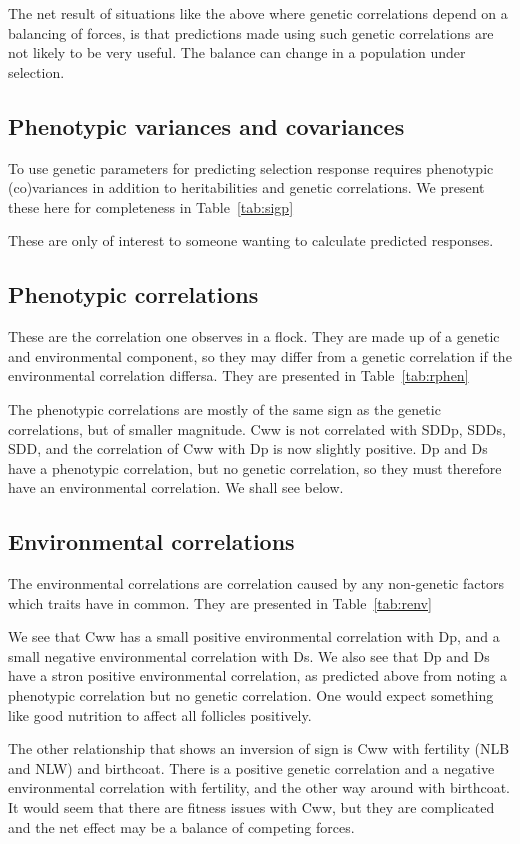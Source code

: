\documentclass[titlepage]{article}  %
\begin{document}
The net result of situations like the above where genetic correlations depend on a balancing of forces, is that predictions made using such genetic correlations are not likely to be very useful. The balance can change in a population under selection.

\subsection{Phenotypic variances and covariances}
To use genetic parameters for predicting selection response requires phenotypic (co)variances in addition to heritabilities and genetic correlations. We present these here for completeness in Table~\ref{tab:sigp}

These are only of interest to someone wanting to calculate predicted responses.

\subsection{Phenotypic correlations}
These are the correlation one observes in a flock. They are made up of a genetic and environmental component, so they may differ from a genetic correlation if the environmental correlation differsa. They are presented in Table~\ref{tab:rphen}

The phenotypic correlations are mostly of the same sign as the genetic correlations, but of smaller magnitude. Cww is not correlated with SDDp, SDDs, SDD, and the  correlation of Cww with Dp is now slightly positive. Dp and Ds have a phenotypic correlation, but no genetic correlation, so they must therefore have an environmental correlation. We shall see below.
 
\subsection{Environmental correlations}
The environmental correlations are correlation caused by any non-genetic factors which traits have in common. They are presented in Table~\ref{tab:renv}

We see that Cww has a small positive environmental correlation with Dp, and a small negative environmental correlation with Ds.  We also see that Dp and Ds have a stron positive environmental correlation, as predicted above from noting a phenotypic correlation but no genetic correlation.  One would expect something like good nutrition to affect all follicles positively. 

The other relationship that shows an inversion of sign is Cww with fertility (NLB and NLW) and birthcoat. There is a positive genetic correlation and a negative environmental correlation with fertility, and the other way around with birthcoat. It would seem that there are fitness issues with Cww, but they are complicated and the net effect may be a balance of competing forces.
\end{document}
